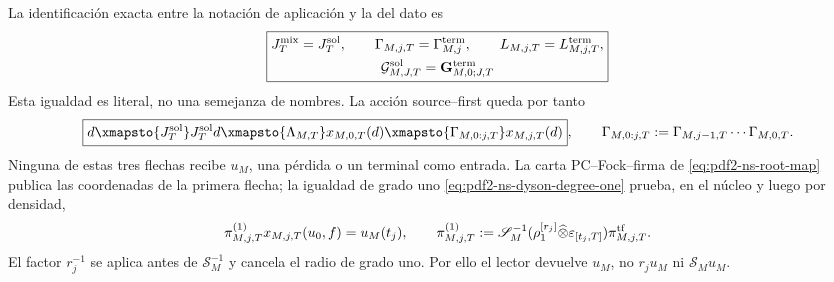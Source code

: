 La identificación exacta entre la notación de aplicación y la del dato es
\begin{equation}\label{eq:pdf2-ns-exact-datum-identification}
 \boxed{\begin{gathered}
 J_T^{\rm mix}=J_T^{\rm sol},\qquad
 \Gamma_{M,j,T}=\Gamma_{M,j}^{\rm term},\qquad
 L_{M,j,T}=L_{M,j,T}^{\rm term},\\
 \mathcal G_{M,J,T}^{\rm sol}=\mathbf G_{M,0;J,T}^{\rm term}
 \end{gathered}}
\end{equation}
Esta igualdad es literal, no una semejanza de nombres. La acción source--first
queda por tanto
\begin{equation}\label{eq:pdf2-ns-source-encoder-action}
 \boxed{\begin{gathered}
 d\xmapsto{J_T^{\rm sol}}J_T^{\rm sol}d
 \xmapsto{\Lambda_{M,T}}x_{M,0,T}(d)
 \xmapsto{\Gamma_{M,0:j,T}}x_{M,j,T}(d)
 \end{gathered}},
 \qquad
 \Gamma_{M,0:j,T}:=\Gamma_{M,j-1,T}\cdots\Gamma_{M,0,T}.
\end{equation}
Ninguna de estas tres flechas recibe $u_M$, una pérdida o un terminal como
entrada. La carta PC--Fock--firma de
\eqref{eq:pdf2-ns-root-map} publica las coordenadas de la primera flecha; la
igualdad de grado uno
\eqref{eq:pdf2-ns-dyson-degree-one} prueba, en el núcleo y luego por densidad,
\begin{equation}\label{eq:pdf2-ns-sol-transition-action}
 \pi_{M,j,T}^{(1)}x_{M,j,T}(u_0,f)=u_M(t_j),
 \qquad
 \pi_{M,j,T}^{(1)}:=
 \mathscr S_M^{-1}
 (\rho_1^{[r_j]}\widehat\otimes\varepsilon_{[t_j,T]})\pi_{M,j,T}^{\rm tf}.
\end{equation}
El factor $r_j^{-1}$ se aplica antes de $\mathscr S_M^{-1}$ y cancela el radio
de grado uno. Por ello el lector devuelve $u_M$, no $r_ju_M$ ni
$\mathscr S_Mu_M$.

